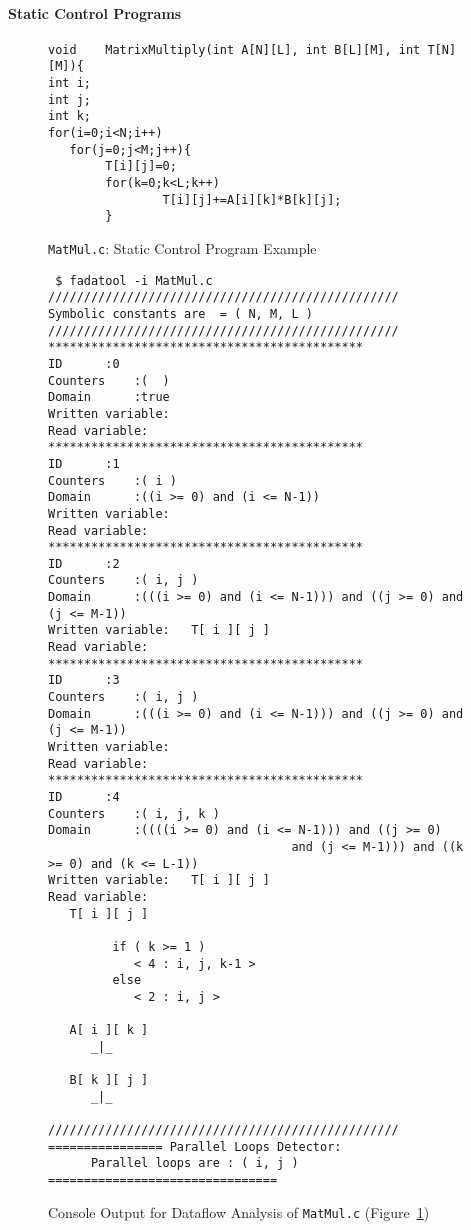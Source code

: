 \paragraph{Static Control Programs}
\begin{figure}[!h]
\begin{footnotesize}
\begin{lstlisting}
void    MatrixMultiply(int A[N][L], int B[L][M], int T[N][M]){
int i;
int j;
int k;
for(i=0;i<N;i++)
   for(j=0;j<M;j++){
        T[i][j]=0;
        for(k=0;k<L;k++)
                T[i][j]+=A[i][k]*B[k][j];
        }
\end{lstlisting}
\end{footnotesize}
\caption{\texttt{MatMul.c}: Static Control Program Example}
\label{pgm:matmul}
\end{figure}




\begin{figure}[!h]
\begin{scriptsize}
\begin{verbatim}
 $ fadatool -i MatMul.c
/////////////////////////////////////////////////
Symbolic constants are  = ( N, M, L )
/////////////////////////////////////////////////
********************************************
ID		:0
Counters	:(  )
Domain		:true
Written variable:
Read variable:
********************************************
ID		:1
Counters	:( i )
Domain		:((i >= 0) and (i <= N-1))
Written variable:
Read variable:
********************************************
ID		:2
Counters	:( i, j )
Domain		:(((i >= 0) and (i <= N-1))) and ((j >= 0) and (j <= M-1))
Written variable:   T[ i ][ j ]
Read variable:
********************************************
ID		:3
Counters	:( i, j )
Domain		:(((i >= 0) and (i <= N-1))) and ((j >= 0) and (j <= M-1))
Written variable:
Read variable:
********************************************
ID		:4
Counters	:( i, j, k )
Domain		:((((i >= 0) and (i <= N-1))) and ((j >= 0) 
                                  and (j <= M-1))) and ((k >= 0) and (k <= L-1))
Written variable:   T[ i ][ j ]
Read variable:
   T[ i ][ j ]

         if ( k >= 1 )
            < 4 : i, j, k-1 > 
         else
            < 2 : i, j >

   A[ i ][ k ]
      _|_

   B[ k ][ j ]
      _|_

/////////////////////////////////////////////////
================ Parallel Loops Detector:
      Parallel loops are : ( i, j ) 
================================
\end{verbatim}
\end{scriptsize}
\caption{Console Output for Dataflow Analysis of \texttt{MatMul.c} (Figure~\ref{pgm:matmul})}
\label{output:matmul}
\end{figure}

